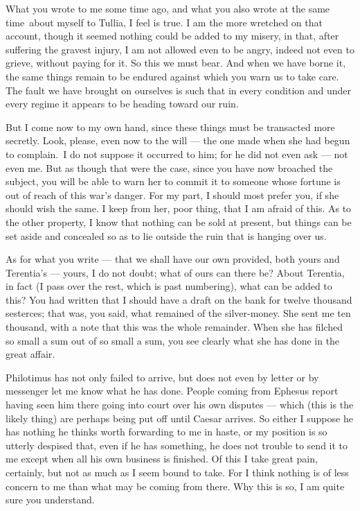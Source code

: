 

 What you wrote to me some time ago, and what you also \dag wrote at the same time\dag\ about myself to Tullia, I feel is true. I am the more wretched on that account, though it seemed nothing could be added to my misery, in that, after suffering the gravest injury, I am not allowed even to be angry, indeed not even to grieve, without paying for it. So this we must bear. And when we have borne it, the same things remain to be endured against which you warn us to take care. The fault we have brought on ourselves is such that in every condition and under every regime it appears to be heading toward our ruin.

 But I come now to my own hand, since these things must be transacted more secretly. Look, please, even now to the will --- the one made when she had begun \dag to complain.\dag\ I do not suppose it occurred to him; for he did not even ask --- not even me. But as though that were the case, since you have now broached the subject, you will be able to warn her to commit it to someone whose fortune is out of reach of this war's danger. For my part, I should most prefer you, if she should wish the same. I keep from her, poor thing, that I am afraid of this. As to the other property, I know that nothing can be sold at present, but things can be set aside and concealed so as to lie outside the ruin that is hanging over us.

 As for what you write --- that we shall have our own provided, both yours and Terentia's --- yours, I do not doubt; what of ours can there be? About Terentia, in fact (I pass over the rest, which is past numbering), what can be added to this? You had written that I should have a draft on the bank for twelve thousand sesterces; that was, you said, what remained of the silver-money. She sent me ten thousand, with a note that this was the whole remainder. When she has filched so small a sum out of so small a sum, you see clearly what she has done in the great affair.

 Philotimus has not only failed to arrive, but does not even by letter or by messenger let me know what he has done. People coming from Ephesus report having seen him there going into court over his own disputes --- which (this is the likely thing) are perhaps being put off until Caesar arrives. So either I suppose he has nothing he thinks worth forwarding to me in haste, or my position is so utterly despised that, even if he has something, he does not trouble to send it to me except when all his own business is finished. Of this I take great pain, certainly, but not as much as I seem bound to take. For I think nothing is of less concern to me than what may be coming from there. Why this is so, I am quite sure you understand.

